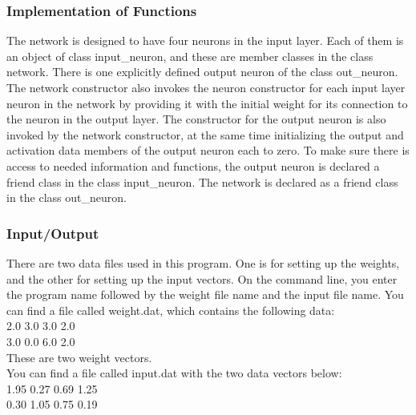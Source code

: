 \documentclass[12pt, right open]{memoir}
\begin{document}
\subsubsection{Implementation of Functions}


The network is designed to have four neurons in the input layer. Each of them is an object of class input\_neuron, and these are member classes in the class network. There is one explicitly defined output neuron of the class out\_neuron. The network constructor also invokes the neuron constructor for each input layer neuron in the network by providing it with the initial weight for its connection to the neuron in the output layer. The constructor for the output neuron is also invoked by the network constructor, at the same time initializing the output and activation data members of the output neuron each to zero. To make sure there is access to needed information and functions, the output neuron is declared a friend class in the class input\_neuron. The network is declared as a friend class in the class out\_neuron.

\subsubsection{Input/Output}
There are two data files used in this program. One is for setting up the weights, and the other for setting up the input vectors. On the command line, you enter the program name followed by the weight file name and the input file name. 
You can find a file called weight.dat, which contains the following data: \\
2.0 3.0 3.0 2.0 \\
3.0 0.0 6.0 2.0 \\
These are two weight vectors. \\
You can find a file called input.dat with the two data vectors below: \\
1.95 0.27 0.69 1.25 \\
0.30 1.05 0.75 0.19 \\
\end{document}
